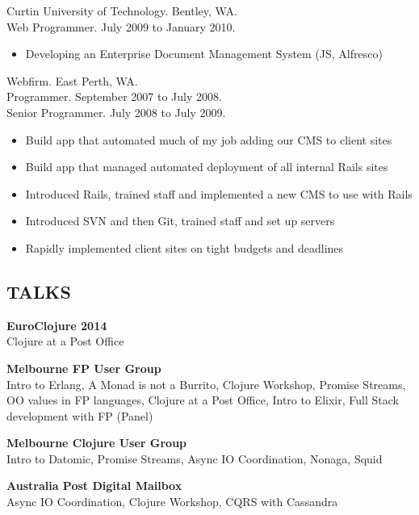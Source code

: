 \documentclass[margin]{res}
\begin{document}
\begin{resume}
  Curtin University of Technology. Bentley, WA. \\
  Web Programmer.  July 2009 to January 2010.
  \begin{itemize}
  \item Developing an Enterprise Document Management System (JS, Alfresco)
  \end{itemize} 

  Webfirm. East Perth, WA. \\
  Programmer.  September 2007 to July 2008. \\
  Senior Programmer. July 2008 to July 2009.
  \begin{itemize}
  \item Build app that automated much of my job adding our CMS to client sites
  \item Build app that managed automated deployment of all internal Rails sites
  \item Introduced Rails, trained staff and implemented a new CMS to use with
    Rails
  \item Introduced SVN and then Git, trained staff and set up servers
  \item Rapidly implemented client sites on tight budgets and deadlines
  \end{itemize} 


  \begin{multicols}{2}
    \section{TALKS}
    \textbf{EuroClojure 2014} \\
    Clojure at a Post Office

    \textbf{Melbourne FP User Group} \\
    Intro to Erlang, A Monad is not a Burrito, Clojure Workshop, Promise
    Streams, OO values in FP languages, Clojure at a Post Office, Intro to
    Elixir, Full Stack development with FP (Panel)

    \textbf{Melbourne Clojure User Group} \\
    Intro to Datomic, Promise Streams, Async IO Coordination, Nonaga, Squid

    \columnbreak

    \textbf{Australia Post Digital Mailbox} \\
    Async IO Coordination, Clojure Workshop, CQRS with Cassandra


\end{multicols}
\end{resume}
\end{document}
